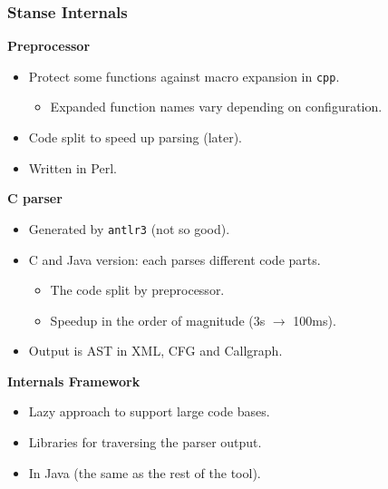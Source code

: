 \documentclass[handout,xcolor=dvipsnames]{beamer}
\newcommand{\heading}[1]{\textbf{\textcolor{BurntOrange}{#1}}}
\begin{document}
\begin{frame}
  \frametitle{Stanse Internals}
  \heading{Preprocessor}
  \begin{itemize}
  \item Protect some functions against macro expansion in \texttt{cpp}.
    \begin{itemize}
    \item Expanded function names vary depending on configuration.
    \end{itemize}
  \item Code split to speed up parsing (later).
  \item Written in Perl.
  \end{itemize}

  \pause

  \heading{C parser}
  \begin{itemize}
  \item Generated by \texttt{antlr3} (not so good).
  \item C and Java version: each parses different code parts.
    \begin{itemize}
    \item The code split by preprocessor.
    \item Speedup in the order of magnitude (3s $\rightarrow$ 100ms).
    \end{itemize}
  \item Output is AST in XML, CFG and Callgraph.
  \end{itemize}

  \pause

  \heading{Internals Framework}
  \begin{itemize}
  \item Lazy approach to support large code bases.
  \item Libraries for traversing the parser output.
  \item In Java (the same as the rest of the tool).
  \end{itemize}

\end{frame}
\end{document}
